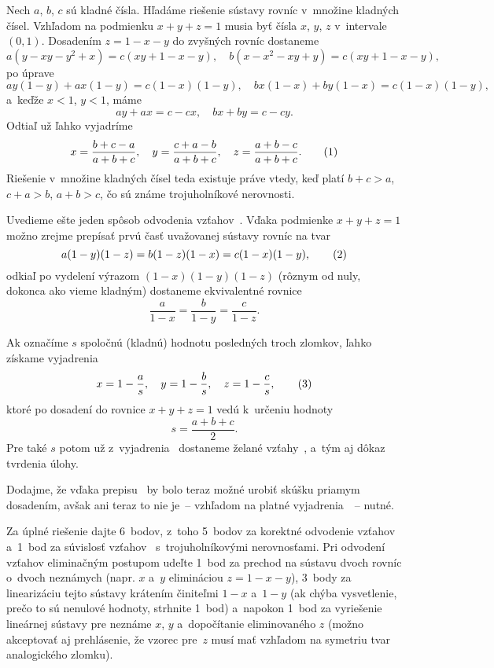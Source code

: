 {%
Nech $a$, $b$, $c$ sú kladné čísla. Hľadáme riešenie sústavy rovníc v~množine kladných čísel. Vzhľadom na podmienku $x+y+z=1$
musia byť čísla $x$, $y$, $z$ v~intervale $(0,1)$.
Dosadením $z=1-x-y$ do zvyšných rovníc dostaneme
$$
a(y-xy-y^2+x)=c(xy+1-x-y),\quad b(x-x^2-xy+y)=c(xy+1-x-y),
$$
po úprave
$$
ay(1-y)+ax(1-y)=c(1-x)(1-y),\quad bx(1-x)+by(1-x)=c(1-x)(1-y),
$$
a~keďže $x<1$, $y<1$, máme
$$
ay+ax=c-cx,\quad bx+by=c-cy.
$$
Odtiaľ už ľahko vyjadríme
$$
x=\frac{b+c-a}{a+b+c},\quad y=\frac{c+a-b}{a+b+c},\quad z=\frac{a+b-c}{a+b+c}.
\tag1
$$
Riešenie v~množine kladných čísel teda existuje práve vtedy, keď platí $b+c>a$, $c+a>b$, $a+b>c$, čo sú známe trojuholníkové nerovnosti.

\ineriesenie
Uvedieme ešte jeden spôsob odvodenia vzťahov~.
Vďaka podmienke $x+y+z=1$ možno zrejme prepísať
prvú časť uvažovanej sústavy rovníc na tvar
$$
a(1-y)(1-z)=b(1-z)(1-x)=c(1-x)(1-y), \tag2
$$
odkiaľ po vydelení výrazom $(1-x)(1-y)(1-z)$ (rôznym od nuly, dokonca
ako vieme kladným) dostaneme ekvivalentné rovnice
$$
\frac{a}{1-x}=\frac{b}{1-y}=\frac{c}{1-z}.
$$

Ak označíme $s$ spoločnú (kladnú) hodnotu posledných troch zlomkov,
ľahko získame vyjadrenia
$$
x=1-\frac{a}{s},\quad
y=1-\frac{b}{s},\quad
z=1-\frac{c}{s},            \tag3
$$
ktoré po dosadení do rovnice $x+y+z=1$ vedú k~určeniu hodnoty
$$
s=\frac{a+b+c}{2}.
$$
Pre také $s$ potom už z~vyjadrenia~
dostaneme želané vzťahy~, a~tým aj dôkaz tvrdenia úlohy.

Dodajme, že vďaka prepisu~
by bolo teraz možné urobiť skúšku priamym dosadením,
avšak ani teraz to nie je~-- vzhľadom na platné vyjadrenia~~-- nutné.

\nobreak\medskip\petit\noindent
Za úplné riešenie dajte 6~bodov, z~toho 5~bodov za korektné
odvodenie vzťahov~
a~1~bod za súvislosť
vzťahov~ s~trojuholníkovými nerovnosťami. Pri odvodení vzťahov 
eliminačným postupom udeľte 1~bod za prechod na sústavu dvoch
rovníc o~dvoch neznámych (napr. $x$ a~$y$ elimináciou $z=1-x-y$),
3~body za linearizáciu tejto sústavy krátením činiteľmi $1-x$
a~$1-y$ (ak chýba vysvetlenie, prečo to sú nenulové
hodnoty, strhnite 1~bod) a~napokon 1~bod za vyriešenie lineárnej
sústavy pre neznáme $x$, $y$ a~dopočítanie eliminovaného $z$
(možno akceptovať aj prehlásenie, že vzorec pre~$z$ musí mať vzhľadom
na symetriu tvar analogického zlomku).

\endpetit
\bigbreak
}

